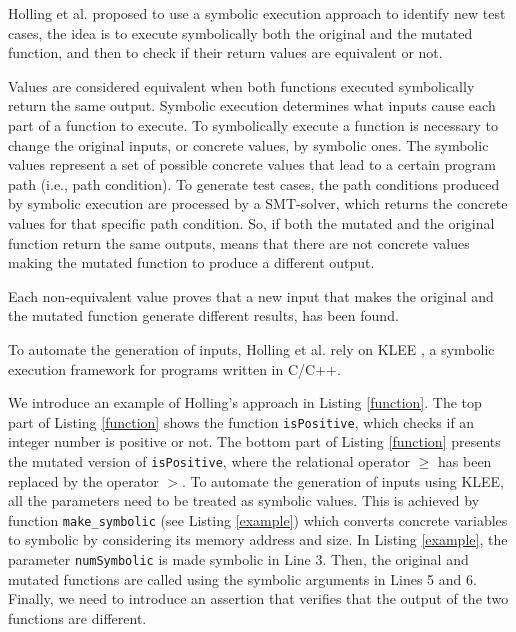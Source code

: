 Holling et al. \cite{holling2016nequivack} proposed to use a symbolic execution approach to identify new test cases, the idea is to execute symbolically both the original and the mutated function, and then to check if their return values are equivalent or not. 

Values are considered equivalent when both functions executed symbolically return the same output. Symbolic execution determines what inputs cause each part of a function to execute. To symbolically execute a function is necessary to change the original inputs, or concrete values, by symbolic ones. The symbolic values represent a set of possible concrete values that lead to a certain program path (i.e., path condition). To generate test cases, the path conditions produced by symbolic execution are processed by a SMT-solver, which returns the concrete values for that specific path condition. 
So, if both the mutated and the original function return the same outputs, means that there are not concrete values making the mutated function to produce a different output.

Each non-equivalent value proves that a new input that makes the original and the mutated function generate different results, has been found. 

To automate the generation of inputs, Holling et al. \cite{holling2016nequivack} rely on KLEE \cite{cadar2008klee}, a symbolic execution framework for programs written in C/C++.

We introduce an example of Holling's approach in Listing \ref{function}. The top part of Listing \ref{function} shows the function \texttt{isPositive}, which checks if an integer number is positive or not. The bottom part of Listing \ref{function} presents the mutated version of \texttt{isPositive}, where the relational operator $\geq$ has been replaced by the operator $>$.
To automate the generation of inputs using KLEE, all the parameters need to be treated as symbolic values.
This is achieved by function \texttt{make\_symbolic} (see Listing \ref{example}) which converts concrete variables to symbolic by considering its memory address and size. 
In Listing \ref{example}, the parameter \texttt{numSymbolic} is made symbolic in Line 3. Then, the original and mutated functions are called using the symbolic arguments in Lines 5 and 6.
Finally, we need to introduce an assertion that verifies that the output of the two functions are different. 

